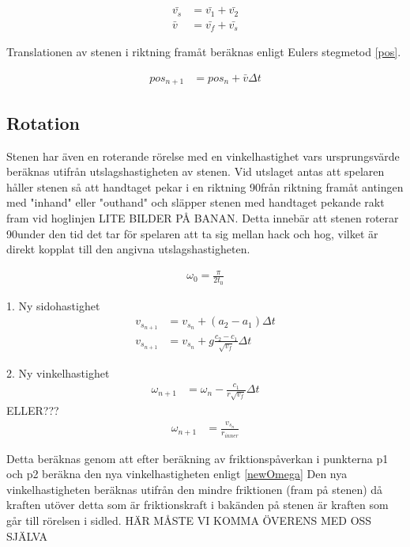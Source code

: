 \documentclass[11pt]{article} %
\begin{document}
 \begin{align}\label{vtot}
 \bar{v_s}& = \bar{v_1}+\bar{v_2}\\
 \bar{v}&=\bar{v_f}+\bar{v_s}
 \end{align}

Translationen av stenen i riktning framåt beräknas enligt Eulers stegmetod \eqref{pos}. 

 \begin{align}\label{pos}
 pos_{n+1}& = pos_{n} + \bar{v} \Delta t
 \end{align}

\subsection{Rotation}


Stenen har även en roterande rörelse med en vinkelhastighet vars ursprungsvärde beräknas utifrån utslagshastigheten av stenen.
Vid utslaget antas att spelaren håller stenen så att handtaget pekar i en riktning 90\textdegree  från riktning framåt antingen med "inhand" eller "outhand" och släpper stenen med handtaget pekande rakt fram vid hoglinjen LITE BILDER PÅ BANAN. Detta innebär att stenen roterar 90\textdegree under den tid det tar för spelaren att ta sig mellan hack och hog, vilket är direkt kopplat till den angivna utslagshastigheten. 

\begin{align}%
 \omega_0 = \frac{\pi}{2 t_0} 
 \end{align}

1. Ny sidohastighet
 \begin{align}\label{vNew}
v_{s_{n+1}}& = v_{s_{n}} + (a_2-a_1) \Delta t\\
v_{s_{n+1}}& = v_{s_{n}} + g \frac{c_2-c_1}{\sqrt{v_f}} \Delta t
 \end{align}

2. Ny vinkelhastighet
 \begin{align}\label{omegaNew}
\omega_{n+1}& = \omega_n - \frac{c_1}{r \sqrt{v_f}} \Delta t
 \end{align}
ELLER??? 
 \begin{align}\label{omegaN}
\omega_{n+1}& = \frac{v_{s_n}} {r_{inner}}
 \end{align}

 Detta beräknas genom att efter beräkning av friktionspåverkan i punkterna p1 och p2 beräkna den nya vinkelhastigheten enligt \eqref{newOmega}
Den nya vinkelhastigheten beräknas utifrån den mindre friktionen (fram på stenen) då kraften utöver detta som är friktionskraft i bakänden på stenen är kraften som går till rörelsen i sidled. HÄR MÅSTE VI KOMMA ÖVERENS MED OSS SJÄLVA
 
\end{document}

